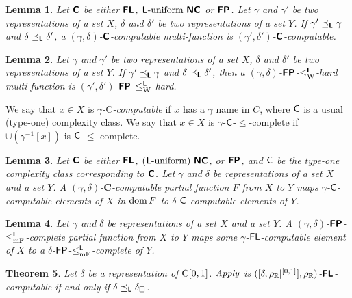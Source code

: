 \documentclass{article}
\newtheorem{theorem}{Theorem}[section]
\newtheorem{lemma}[theorem]{Lemma}
\theoremstyle{definition}
\theoremstyle{remark}
\begin{document}
\begin{lemma}
 Let $\text{\bfseries \sffamily \upshape C}$ be either $\text{\bfseries \sffamily \upshape FL}$, $\text{\bfseries \sffamily \upshape L}\text{-uniform}\ \text{\bfseries \sffamily \upshape NC}$ or
 $\text{\bfseries \sffamily \upshape FP}$.
 Let $\gamma$ and $\gamma'$ be two representations of a set $X$, 
 $\delta$ and $\delta'$ be two representations of a set $Y$.
 If $\gamma' \preceq_{\text{\bfseries \sffamily \upshape L}} \gamma$ and $\delta \preceq_{\text{\bfseries \sffamily \upshape L}} \delta'$,
 a $(\gamma, \delta)$-$\text{\bfseries \sffamily \upshape C}$-computable multi-function is
 $(\gamma', \delta')$-$\text{\bfseries \sffamily \upshape C}$-computable.
\end{lemma}

\begin{lemma}
 Let $\gamma$ and $\gamma'$ be two representations of a set $X$, 
 $\delta$ and $\delta'$ be two representations of a set $Y$.
 If $\gamma' \preceq_{\text{\bfseries \sffamily \upshape L}} \gamma$ and $\delta \preceq_{\text{\bfseries \sffamily \upshape L}} \delta'$,
 then a $(\gamma, \delta)$-$\text{\bfseries \sffamily \upshape FP}$-$\leq _{\mathrm W} ^{\text{\bfseries \sffamily \upshape L}}$-hard multi-function is
 $(\gamma', \delta')$-$\text{\bfseries \sffamily \upshape FP}$-$\leq _{\mathrm W} ^{\text{\bfseries \sffamily \upshape L}}$-hard.
\end{lemma}

We say that $x \in X$ is \emph{$\gamma$-$\mathrm C$-computable} if
$x$ has a $\gamma$ name in $C$,
where $\mathsf{C}$ is a usual (type-one) complexity class.
We say that $x \in X$ is $\gamma$-$\mathsf{C}$-$\le$-complete if
$\cup(\gamma^{-1}[x])$ is $\mathsf{C}$-$\le$-complete.

\begin{lemma}
 Let $\text{\bfseries \sffamily \upshape C}$ be either $\text{\bfseries \sffamily \upshape FL}$, $(\text{\bfseries \sffamily \upshape L}\text{-uniform})\ \text{\bfseries \sffamily \upshape NC}$, 
 or $\text{\bfseries \sffamily \upshape FP}$, and $\mathsf{C}$ be the type-one complexity class
 corresponding to $\text{\bfseries \sffamily \upshape C}$.
 Let $\gamma$ and $\delta$ be representations of a set $X$ and a set $Y$.
 A $(\gamma, \delta)$-$\mathbf C$-computable partial function $F$ from $X$
 to $Y$ maps $\gamma$-$\mathsf{C}$-computable elements of $X$
 in $\mathop{\rm dom} F$ to $\delta$-$\mathsf{C}$-computable elements of $Y$.
\end{lemma}

\begin{lemma}
 \label{lemma:p-comp-maps-l-to-p-comp}
 Let $\gamma$ and $\delta$ be representations of a set $X$ and a set $Y$.
 A $(\gamma, \delta)$-$\text{\bfseries \sffamily \upshape FP}$-$\leq _{\mathrm{mF}} ^{\text{\bfseries \sffamily \upshape L}}$-complete partial function 
 from $X$ to $Y$ maps some $\gamma$-$\mathsf{FL}$-computable element of $X$
 to a $\delta$-$\mathsf{FP}$-$\leq _{\mathrm{mF}}^{\mathsf{L}}$-complete of $Y$.
\end{lemma}



\begin{theorem}
 \label{theorem:apply-is-L-computable}
 Let $\delta$ be a representation of $\mathrm C[0, 1]$.
 $\mathit{Apply}$ is $([\delta, \rho _\mathbb R|^{[0,1]}], \rho _\mathbb R)$-$\text{\bfseries \sffamily \upshape FL}$-computable if
 and only if $\delta \preceq_{\text{\bfseries \sffamily \upshape L}} \delta _\square$.
\end{theorem}
\end{document}
